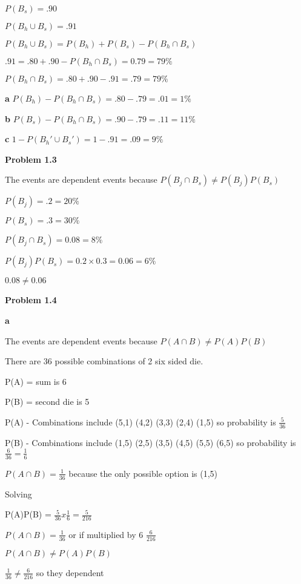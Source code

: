 \documentclass[12pt, letterpaper]{article}
\begin{document}
$P(B_s) = .90$

$P(B_h \cup B_s) = .91$

$P(B_h \cup B_s) = P(B_h) + P(B_s) - P(B_h \cap B_s)$ 

$.91 = .80 + .90 - P(B_h \cap B_s) = 0.79 = 79\%$

$P(B_h \cap B_s) = .80 + .90 - .91 = .79 = 79\%$

\hfill

\textbf{a} $P(B_h) - P(B_h \cap B_s) = .80 - .79 = .01 = 1\%$

\hfill

\textbf{b} $P(B_s) - P(B_h \cap B_s) = .90 - .79 = .11 = 11\%$

\hfill

\textbf{c} $1 - P(B_h' \cup B_s') = 1 - .91 = .09 = 9\%$

\textbf{Problem 1.3}

The events are dependent events because $P(B_j \cap B_s) \neq P(B_j)P(B_s)$

$P(B_j) = .2 = 20\%$

$P(B_s) = .3 = 30\%$

$P(B_j \cap B_s) = 0.08 = 8\%$

$P(B_j)P(B_s) = 0.2 \times 0.3 = 0.06 = 6\%$

$0.08 \neq 0.06$

\textbf{Problem 1.4}

\textbf{a} 

The events are dependent events because $P(A \cap B) \neq P(A)P(B)$

There are 36 possible combinations of 2 six sided die.

P(A) = sum is 6

P(B) = second die is 5

P(A) - Combinations include (5,1) (4,2) (3,3) (2,4) (1,5) so probability is $\frac{5}{36}$

P(B) - Combinations include (1,5) (2,5) (3,5) (4,5) (5,5) (6,5) so probability is $\frac{6}{36} = \frac{1}{6}$

$P(A \cap B) = \frac{1}{36}$ because the only possible option is (1,5)

Solving 

P(A)P(B) = $\frac{5}{36} x \frac{1}{6} = \frac{5}{216}$

$P(A \cap B) = \frac{1}{36}$ or if multiplied by 6 $\frac{6}{216}$

$P(A \cap B) \neq P(A)P(B)$

$\frac{1}{36}\neq\frac{6}{216}$ so they dependent
\end{document}
